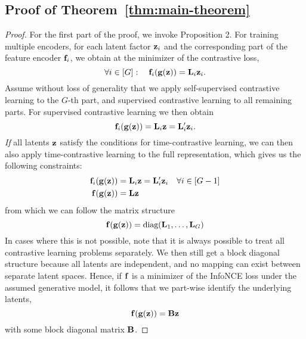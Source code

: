 \subsection{Proof of Theorem~\ref{thm:main-theorem}}\label{sec:proof-main-theorem}


        \begin{proof}
            For the first part of the proof, we invoke Proposition 2. For training multiple encoders, for each latent factor $\mathbf{z}_i$ and the corresponding part of the feature encoder $\mathbf{f}_i$, we obtain at the minimizer of the contrastive loss, 
            \begin{equation}
                \forall i \in [G]: \quad \mathbf{f}_i(\mathbf{g}(\mathbf{z})) = \mathbf{L}_i \mathbf{z}_i.
            \end{equation}
            Assume without loss of generality that we apply self-supervised contrastive learning to the $G$-th part, and supervised contrastive learning to all remaining parts.
            For supervised contrastive learning we then obtain
            \begin{equation}
                \mathbf{f}_i(\mathbf{g}(\mathbf{z})) = \mathbf{L}_i \mathbf{z} = \mathbf{L}'_i \mathbf{z}_i.
            \end{equation}
            \emph{If} all latents $\mathbf{z}$ satisfy the conditions for time-contrastive learning, we can then also apply time-contrastive learning to the full representation, which gives us the following constraints:
            \begin{align}
                \mathbf{f}_i(\mathbf{g}(\mathbf{z})) &= \mathbf{L}_i \mathbf{z} = \mathbf{L}'_i \mathbf{z}_i \quad \forall i\in[G-1] \\
                \mathbf{f}(\mathbf{g}(\mathbf{z})) &= \mathbf{L} \mathbf{z}
            \end{align}
            from which we can follow the matrix structure
            \begin{equation}
                \mathbf{f}(\mathbf{g}(\mathbf{z})) = \text{diag}(\mathbf{L}_1, \dots, \mathbf{L}_G)
            \end{equation}
            In cases where this is not possible, note that it is always possible to treat all contrastive learning problems separately. We then still get a block diagonal structure because all latents are independent, and no mapping can exist between separate latent spaces.
            Hence, if $\mathbf{f}$ is a minimizer of the InfoNCE loss under the assumed generative model, it follows that we part-wise identify the underlying latents,
            \begin{equation}
                \mathbf{f}(\mathbf{g}(\mathbf{z})) = \mathbf{B} \mathbf{z}
            \end{equation}
            with some block diagonal matrix $\mathbf{B}$.
            

\end{proof}
